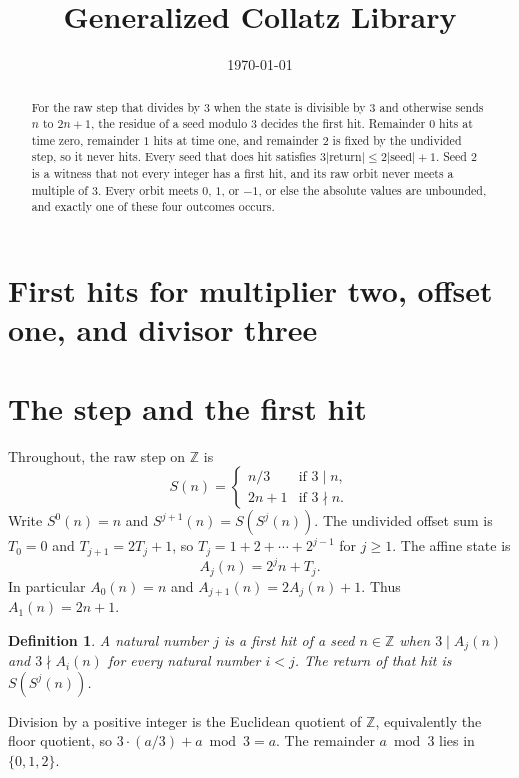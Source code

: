 \documentclass[11pt,letterpaper]{article}
\title{Generalized Collatz Library}
\author{}
\date{\today}
\newcommand{\Z}{\mathbb{Z}}
\newtheorem{definition}[theorem]{Definition}
\begin{document}
\maketitle
\section*{First hits for multiplier two, offset one, and divisor three}

\begin{abstract}
For the raw step that divides by \(3\) when the state is divisible by \(3\) and otherwise sends \(n\) to \(2n+1\), the residue of a seed modulo \(3\) decides the first hit. Remainder \(0\) hits at time zero, remainder \(1\) hits at time one, and remainder \(2\) is fixed by the undivided step, so it never hits. Every seed that does hit satisfies \(3\lvert\mathrm{return}\rvert\le 2\lvert\mathrm{seed}\rvert+1\). Seed \(2\) is a witness that not every integer has a first hit, and its raw orbit never meets a multiple of \(3\). Every orbit meets \(0\), \(1\), or \(-1\), or else the absolute values are unbounded, and exactly one of these four outcomes occurs.
\end{abstract}

\section{The step and the first hit}

Throughout, the raw step on \(\Z\) is
\[
  S(n)=
  \begin{cases}
    n/3 & \text{if }3\mid n,\\
    2n+1 & \text{if }3\nmid n.
  \end{cases}
\]
Write \(S^{0}(n)=n\) and \(S^{j+1}(n)=S(S^{j}(n))\). The undivided offset sum is \(T_{0}=0\) and \(T_{j+1}=2T_{j}+1\), so \(T_{j}=1+2+\cdots+2^{j-1}\) for \(j\ge 1\). The affine state is
\[
  A_{j}(n)=2^{j}n+T_{j}.
\]
In particular \(A_{0}(n)=n\) and \(A_{j+1}(n)=2A_{j}(n)+1\). Thus \(A_{1}(n)=2n+1\).

\begin{definition}
A natural number \(j\) is a first hit of a seed \(n\in\Z\) when \(3\mid A_{j}(n)\) and \(3\nmid A_{i}(n)\) for every natural number \(i<j\). The return of that hit is \(S(S^{j}(n))\).
\end{definition}

Division by a positive integer is the Euclidean quotient of \(\Z\), equivalently the floor quotient, so \(3\cdot(a/3)+a\bmod 3=a\). The remainder \(a\bmod 3\) lies in \(\{0,1,2\}\).
\end{document}
